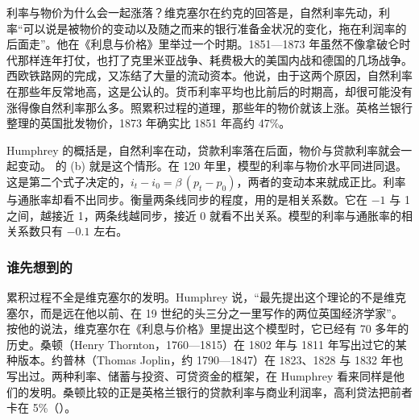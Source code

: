 
利率与物价为什么会一起涨落？维克塞尔在约克的回答是，自然利率先动，利率“可以说是被物价的变动以及随之而来的银行准备金状况的变化，拖在利润率的后面走”\cite{wicksell1907}。他在《利息与价格》里举过一个时期。1851—1873 年虽然不像拿破仑时代那样连年打仗，也打了克里米亚战争、耗费极大的美国内战和德国的几场战争\cite{wicksell1936}。西欧铁路网的完成，又冻结了大量的流动资本\cite{wicksell1936}。他说，由于这两个原因，自然利率在那些年反常地高，这是公认的\cite{wicksell1936}。货币利率平均也比前后的时期高，却很可能没有涨得像自然利率那么多\cite{wicksell1936}。照累积过程的道理，那些年的物价就该上涨。英格兰银行整理的英国批发物价，1873 年确实比 1851 年高约 47\%\cite{boe2017}。

Humphrey 的概括是，自然利率在动，贷款利率落在后面，物价与贷款利率就会一起变动\cite{humphrey1986}。 的 (b) 就是这个情形。在 120 年里，模型的利率与物价水平同进同退。这是第二个式子决定的，$i_t-i_0=\beta\,(p_t-p_0)$，两者的变动本来就成正比。利率与通胀率却看不出同步。衡量两条线同步的程度，用的是相关系数。它在 $-1$ 与 1 之间，越接近 1，两条线越同步，接近 0 就看不出关系。模型的利率与通胀率的相关系数只有 $-0.1$ 左右。

\subsubsection{谁先想到的}
累积过程不全是维克塞尔的发明。Humphrey 说，“最先提出这个理论的不是维克塞尔，而是远在他以前、在 19 世纪的头三分之一里写作的两位英国经济学家”\cite{humphrey1986}。按他的说法，维克塞尔在《利息与价格》里提出这个模型时，它已经有 70 多年的历史\cite{humphrey1986}。桑顿（Henry Thornton，1760—1815）在 1802 年与 1811 年写出过它的某种版本\cite{humphrey1986}。约普林（Thomas Joplin，约 1790—1847）在 1823、1828 与 1832 年也写出过\cite{humphrey1986,watt1892}。两种利率、储蓄与投资、可贷资金的框架，在 Humphrey 看来同样是他们的发明\cite{humphrey1986}。桑顿比较的正是英格兰银行的贷款利率与商业利润率，高利贷法把前者卡在 5\%（）。

